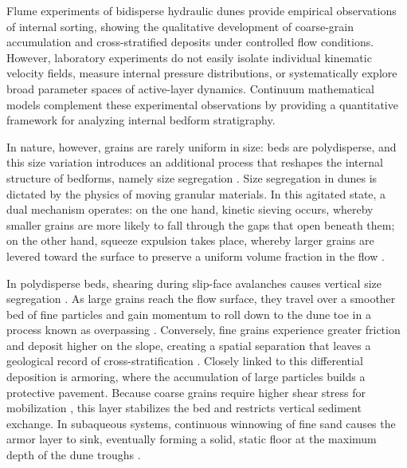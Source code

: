 \documentclass[lineno]{JFM-FLM_Au}
\begin{document}
Flume experiments of bidisperse hydraulic dunes provide empirical observations of internal sorting, showing the qualitative development of coarse-grain accumulation and cross-stratified deposits under controlled flow conditions. However, laboratory experiments do not easily isolate individual kinematic velocity fields, measure internal pressure distributions, or systematically explore broad parameter spaces of active-layer dynamics. Continuum mathematical models complement these experimental observations by providing a quantitative framework for analyzing internal bedform stratigraphy.

In nature, however, grains are rarely uniform in size: beds are polydisperse, and this size variation introduces an additional process that reshapes the internal structure of bedforms, namely size segregation \citep{blondeaux2012}. Size segregation in dunes is dictated by the physics of moving granular materials. In this agitated state, a dual mechanism operates: on the one hand, kinetic sieving occurs, whereby smaller grains are more likely to fall through the gaps that open beneath them; on the other hand, squeeze expulsion takes place, whereby larger grains are levered toward the surface to preserve a uniform volume fraction in the flow \citep{gray2005,Gray2018,trewhela2021}.

In polydisperse beds, shearing during slip-face avalanches causes vertical size segregation \citep{gray2005,trewhela2021}. As large grains reach the flow surface, they travel over a smoother bed of fine particles and gain momentum to roll down to the dune toe in a process known as overpassing \citep{reesink2007,kleinhans2004_34}. Conversely, fine grains experience greater friction and deposit higher on the slope, creating a spatial separation that leaves a geological record of cross-stratification \citep{gao2016,bristow2000}. Closely linked to this differential deposition is armoring, where the accumulation of large particles builds a protective pavement. Because coarse grains require higher shear stress for mobilization \citep{shields1936anwendung}, this layer stabilizes the bed and restricts vertical sediment exchange. In subaqueous systems, continuous winnowing of fine sand causes the armor layer to sink, eventually forming a solid, static floor at the maximum depth of the dune troughs \citep{blom2003,blom2008}.
\end{document}
